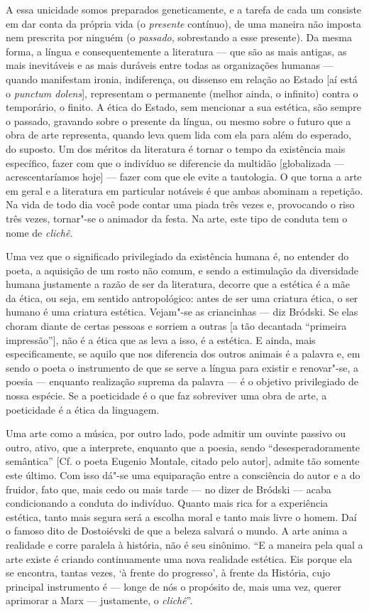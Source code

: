 {{{A essa unicidade somos preparados geneticamente, e a tarefa de cada um
consiste em dar conta da própria vida (o \emph{presente} contínuo), de
uma maneira não imposta nem prescrita por ninguém (o \emph{passado},
sobrestando a esse presente). Da mesma forma, a língua e
consequentemente a literatura --- que são as mais antigas, as mais
inevitáveis e as mais duráveis entre todas as organizações humanas ---
quando manifestam ironia, indiferença, ou dissenso em relação ao Estado
[aí está o \emph{punctum dolens}], representam o permanente (melhor ainda, o infinito) contra o temporário, o finito. A ética do
Estado, sem mencionar a sua estética, são sempre o passado, gravando
sobre o presente da língua, ou mesmo sobre o futuro que a obra de arte
representa, quando leva quem lida com ela para além do esperado, do
suposto. Um dos méritos da literatura é tornar o tempo da existência
mais específico, fazer com que o indivíduo se diferencie da multidão
{[}globalizada --- acrescentaríamos hoje{]} --- fazer com que ele evite a
tautologia. O que torna a arte em geral e a literatura em particular
notáveis é que ambas abominam a repetição. Na vida de todo dia você pode
contar uma piada três vezes e, provocando o riso três vezes, tornar"-se o
animador da festa. Na arte, este tipo de conduta tem o nome de
\emph{clichê.}

Uma vez que o significado privilegiado da existência humana é, no
entender do poeta, a aquisição de um rosto não comum, e sendo a
estimulação da diversidade humana justamente a razão de ser da
literatura, decorre que a estética é a mãe da ética, ou seja, em sentido
antropológico: antes de ser uma criatura ética, o ser humano é uma
criatura estética. Vejam"-se as criancinhas --- diz Bródski. Se elas
choram diante de certas pessoas e sorriem a outras {[}a tão decantada
``primeira impressão''{]}, não é a ética que as leva a isso, é a
estética. E ainda, mais especificamente, se aquilo que nos diferencia
dos outros animais é a palavra e, em sendo o poeta o instrumento de que se
serve a língua para existir e renovar"-se, a poesia --- enquanto
realização suprema da palavra --- é o objetivo privilegiado de nossa
espécie. Se a poeticidade é o que faz sobreviver uma obra de arte, a
poeticidade é a ética da linguagem.

Uma arte como a música, por outro lado, pode admitir um ouvinte passivo
ou outro, ativo, que a interprete, enquanto que a poesia, sendo
``desesperadoramente semântica'' {[}Cf. o poeta Eugenio Montale, citado
pelo autor{]}, admite tão somente este último. Com isso dá"-se uma
equiparação entre a consciência do autor e a do fruidor, fato que, mais
cedo ou mais tarde --- no dizer de Bródski --- acaba condicionando a
conduta do indivíduo. Quanto mais rica for a experiência estética, tanto
mais segura será a escolha moral e tanto mais livre o homem. Daí o
famoso dito de Dostoiévski de que a beleza salvará o mundo. A arte anima
a realidade e corre paralela à história, não é seu sinônimo. ``E a
maneira pela qual a arte existe é criando continuamente uma nova
realidade estética. Eis porque ela se encontra, tantas vezes, `à frente
do progresso', à frente da História, cujo principal instrumento é ---
longe de nós o propósito de, mais uma vez, querer aprimorar a Marx ---
justamente, o \emph{clichê}''.

}}}
